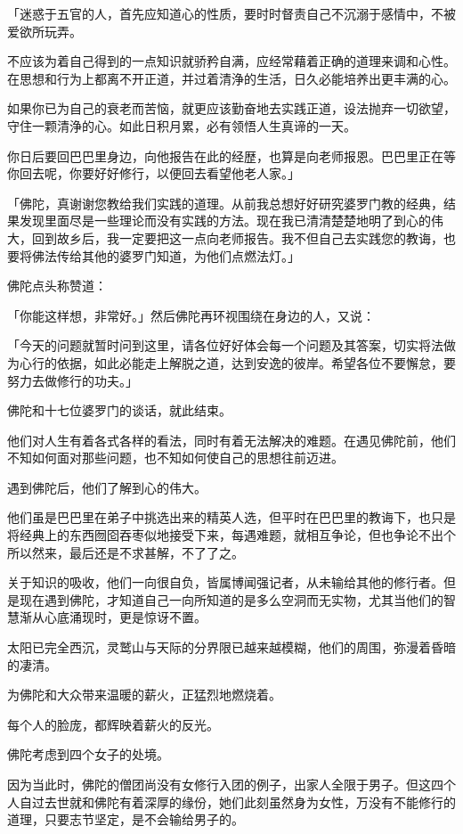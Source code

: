 \documentclass[twoside,openany]{book}
\begin{document}
「迷惑于五官的人，首先应知道心的性质，要时时督责自己不沉溺于感情中，不被爱欲所玩弄。

不应该为着自己得到的一点知识就骄矜自满，应经常藉着正确的道理来调和心性。在思想和行为上都离不开正道，并过着清浄的生活，日久必能培养出更丰满的心。

如果你已为自己的衰老而苦恼，就更应该勤奋地去实践正道，设法抛弃一切欲望，守住一颗清浄的心。如此日积月累，必有领悟人生真谛的一天。

你日后要回巴巴里身边，向他报告在此的经歴，也算是向老师报恩。巴巴里正在等你回去呢，你要好好修行，以便回去看望他老人家。」

「佛陀，真谢谢您教给我们实践的道理。从前我总想好好研究婆罗门教的经典，结果发现里面尽是一些理论而没有实践的方法。现在我已清清楚楚地明了到心的伟大，回到故乡后，我一定要把这一点向老师报告。我不但自己去实践您的教诲，也要将佛法传给其他的婆罗门知道，为他们点燃法灯。」

佛陀点头称赞道：

「你能这样想，非常好。」然后佛陀再环视围绕在身边的人，又说：

「今天的问题就暂时问到这里，请各位好好体会每一个问题及其答案，切实将法做为心行的依据，如此必能走上解脱之道，达到安逸的彼岸。希望各位不要懈怠，要努力去做修行的功夫。」

佛陀和十七位婆罗门的谈话，就此结束。

他们对人生有着各式各样的看法，同时有着无法解决的难题。在遇见佛陀前，他们不知如何面对那些问题，也不知如何使自己的思想往前迈进。

遇到佛陀后，他们了解到心的伟大。

他们虽是巴巴里在弟子中挑选出来的精英人选，但平时在巴巴里的教诲下，也只是将经典上的东西囫囵吞枣似地接受下来，每遇难题，就相互争论，但也争论不出个所以然来，最后还是不求甚解，不了了之。

关于知识的吸收，他们一向很自负，皆属博闻强记者，从未输给其他的修行者。但是现在遇到佛陀，才知道自己一向所知道的是多么空洞而无实物，尤其当他们的智慧渐从心底涌现时，更是惊讶不置。

太阳已完全西沉，灵鹫山与天际的分界限已越来越模糊，他们的周围，弥漫着昏暗的凄清。

为佛陀和大众带来温暖的薪火，正猛烈地燃烧着。

每个人的脸庞，都辉映着薪火的反光。

佛陀考虑到四个女子的处境。

因为当此时，佛陀的僧团尚没有女修行入团的例子，出家人全限于男子。但这四个人自过去世就和佛陀有着深厚的缘份，她们此刻虽然身为女性，万没有不能修行的道理，只要志节坚定，是不会输给男子的。
\end{document}
